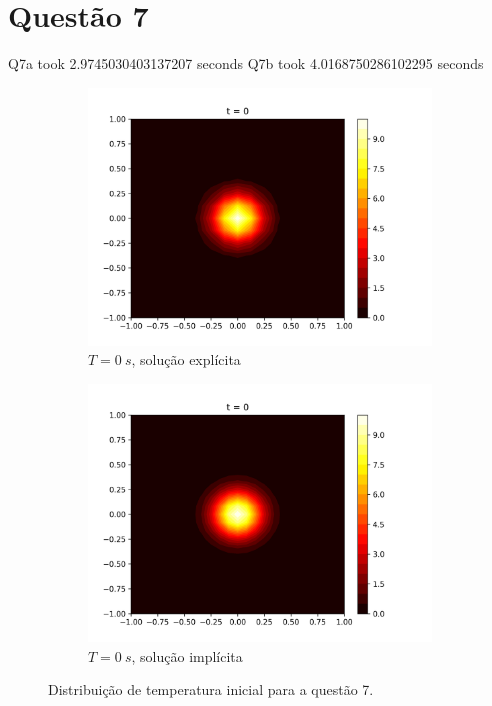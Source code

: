 \documentclass{article}
\begin{document}
\section{Questão 7}

Q7a took 2.9745030403137207 seconds
Q7b took 4.0168750286102295 seconds
\begin{figure}[h]
\centering
     \begin{subfigure}[b]{0.49\textwidth}
         \centering
         \includegraphics[width=\textwidth]{figs/q7a_heatmap_t0.png}
         \caption{$T=0~s$, solução explícita}
	\label{fig:q7a_heatmap_t0}
     \end{subfigure}
     \hfill
     \begin{subfigure}[b]{0.49\textwidth}
         \centering
     \includegraphics[width=\textwidth]{figs/q7b_heatmap_t0.png}
         \caption{$T=0~s$, solução implícita}
	\label{fig:q7b_heatmap_t0}
     \end{subfigure}
	\caption{Distribuição de temperatura inicial para a questão 7.}
\end{figure}
\end{document}

